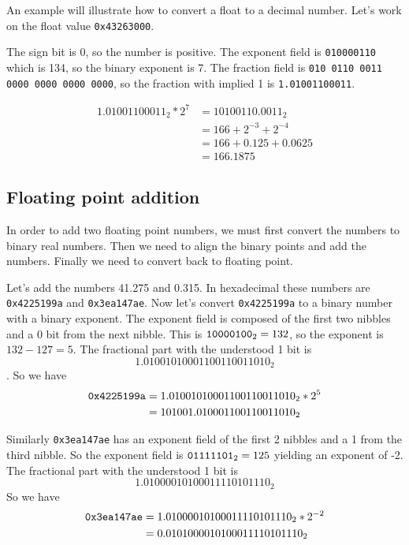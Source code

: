 \documentclass[11pt,b5paper]{book}
\begin{document}
An example will illustrate how to convert a float to a decimal number.
Let's work on the float value {\tt 0x43263000}.

The sign bit is 0, so the number is positive.
The exponent field is {\tt 010000110} which is 134, so the binary exponent is 7.
The fraction field is {\tt 010 0110 0011 0000 0000 0000 0000}, so the fraction with implied 1 is
{\tt 1.01001100011}.
\begin{center}
 \begin{align*}
  1.01001100011_2 * 2^7 &= 10100110.0011_2 \\
                     &= 166 + 2^{-3} + 2^{-4} \\
                     &= 166 + 0.125 + 0.0625 \\
                     &= 166.1875
 \end{align*}

\end{center}

\subsection{Floating point addition}

In order to add two floating point numbers, we must first convert the numbers to binary real numbers.
Then we need to align the binary points and add the numbers.
Finally we need to convert back to floating point.

Let's add the numbers 41.275 and 0.315.
In hexadecimal these numbers are {\tt 0x4225199a} and {\tt 0x3ea147ae}.
Now let's convert {\tt 0x4225199a} to a binary number with a binary exponent.
The exponent field is composed of the first two nibbles and a 0 bit from the next nibble.
This is ${\tt 10000100}_2 = 132$, so the exponent is $132-127=5$.
The fractional part with the understood 1 bit is
$$1.01001010001100110011010_2$$.
So we have
\begin{align*}
{\tt 0x4225199a} &= 1.01001010001100110011010_2 * 2^5 \\
                 &= 101001.010001100110011010_2
\end{align*}

Similarly {\tt 0x3ea147ae} has an exponent field of the first 2 nibbles and a 1 from the third nibble.
So the exponent field is ${\tt 01111101}_2 = 125$ yielding an exponent of -2.
The fractional part with the understood 1 bit is
$$1.01000010100011110101110_2$$
So we have
\begin{align*}
{\tt 0x3ea147ae} &= 1.01000010100011110101110_2 * 2^{-2} \\
                 &= 0.0101000010100011110101110_2
\end{align*}
\end{document}
